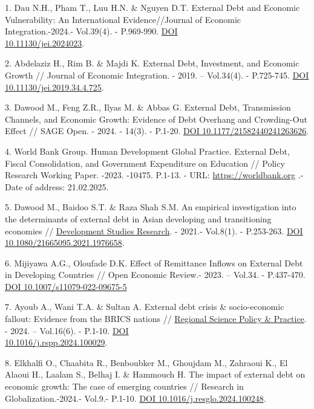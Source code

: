 \begin{references}
1. Dau N.H., Pham T., Luu H.N. \& Nguyen D.T. External Debt and Economic
Vulnerability: An Internat\-ional Evidence//Journal of Economic
Integration.-2024.- Vol.39(4). - P.969-990.
\href{https://doi.org/10.11130/jei.2024023}{DOI \\10.11130/jei.2024023}.

2. Abdelaziz H., Rim B. \& Majdi K. External Debt, Investment, and
Economic Growth // Journal of Economic Integration. - 2019. --
Vol.34(4). - P.725-745.
\href{https://doi.org/10.11130/jei.2019.34.4.725}{DOI
10.11130/jei.2019.34.4.725}.

3. Dawood M., Feng Z.R., Ilyas M. \& Abbas G. External Debt,
Transmission Channels, and Economic Growth: Evidence of Debt Overhang
and Crowding-Out Effect // SAGE Open. - 2024. - 14(3). - P.1-20.
\href{https://doi.org/10.1177/21582440241263626}{DOI
10.1177/21582440241263626}.

4. World Bank Group. Human Development Global Practice. External Debt,
Fiscal Consolidation, and Government Expenditure on Education // Policy
Research Working Paper. -2023. -10475. P.1-13. - URL:
\href{https://documents1.worldbank.org/curated/en/099748506072325934/pdf/IDU09d7e7fa50fbff046e00a8a80e07ac5341e5b.pdf}{https://worldbank.org} .-
Date of address: 21.02.2025.

5. Dawood M., Baidoo S.T. \& Raza Shah S.M. An empirical investigation
into the determinants of external debt in Asian developing and
transitioning economies //
\href{https://www.tandfonline.com/journals/rdsr20}{Development Studies
Research}. - 2021.- Vol.8(1). - P.253-263.
\href{https://doi.org/10.1080/21665095.2021.1976658}{DOI
10.1080/21665095.2021.1976658}.

6. Mijiyawa A.G., Oloufade D.K. Effect of Remittance Inflows on External
Debt in Developing Countries // Open Economic Review.- 2023. -- Vol.34.
- P.437-470. \href{https://doi.org/10.1007/s11079-022-09675-5}{DOI
10.1007/s11079-022-09675-5}

7. Ayoub A., Wani T.A. \& Sultan A. External debt crisis \&
socio-economic fallout: Evidence from the BRICS nations //
\href{https://www.sciencedirect.com/journal/regional-science-policy-and-practice}{Regional
Science Policy \& Practice}. - 2024. -- Vol.16(6). - P.1-10.
\href{https://doi.org/10.1016/j.rspp.2024.100029}{DOI\\
10.1016/j.rspp.2024.100029}.

8. Elkhalfi O., Chaabita R., Benboubker M., Ghoujdam M., Zahraoui K., El
Alaoui H., Laalam S., Belhaj I. \& Hammouch H. The impact of external
debt on economic growth: The case of emerging countries // Research in
Globalization.-2024.- Vol.9.- P.1-10.
\href{https://doi.org/10.1016/j.resglo.2024.100248}{DOI
10.1016/j.resglo.2024.100248}.


\end{references}
